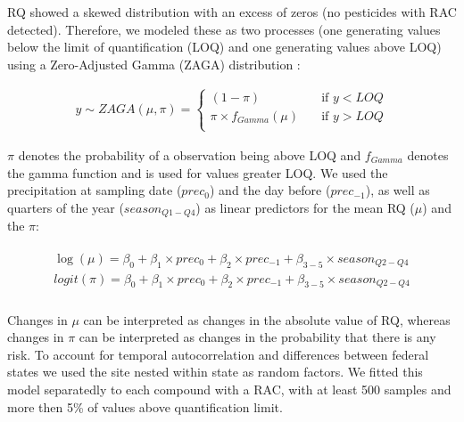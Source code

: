 \documentclass[journal=esthag,manuscript=article]{achemso}
\begin{document}
RQ showed a skewed distribution with an excess of zeros (no pesticides with RAC detected). 
Therefore, we modeled these as two processes (one generating values below the limit of quantification (LOQ) and one generating values above LOQ) using a Zero-Adjusted Gamma (ZAGA) distribution :

\begin{align}
y \sim ZAGA(\mu, \pi) = 
  \begin{cases}
    (1 - \pi)   & \quad  \text{if } y < LOQ \\
    \pi \times f_{Gamma} (\mu) & \quad \text{if } y > LOQ \\
  \end{cases}
  \label{eqn:eqn3}
\end{align}

$\pi$ denotes the probability of a observation being above LOQ and $f_{Gamma}$ denotes the gamma function and is used for values greater LOQ.
We used the precipitation at sampling date ($prec_0$) and the day before ($prec_{-1}$), as well as quarters of the year ($season_{Q1-Q4}$) as linear predictors for the mean RQ ($\mu$) and the $\pi$:

\begin{align}
\begin{split}
\log(\mu) = \beta_0 + \beta_1 \times prec_0 + \beta_2 \times prec_{-1} + \beta_{3-5} \times season_{Q2-Q4} \\
logit(\pi) = \beta_0 + \beta_1 \times prec_0 + \beta_2 \times prec_{-1} + \beta_{3-5} \times season_{Q2-Q4} \\
\end{split}
\label{eqn:eqn4}
\end{align}

Changes in $\mu$ can be interpreted as changes in the absolute value of RQ, whereas changes in $\pi$ can be interpreted as changes in the probability that there is any risk.
To account for temporal autocorrelation and differences between federal states we used the site nested within state as random factors.
We fitted this model separatedly to each compound with a RAC, with at least 500 samples and more then 5\% of values above quantification limit.


\end{document}
